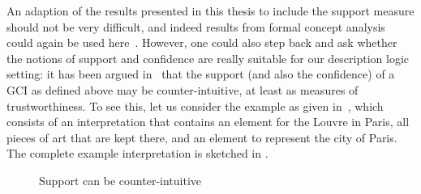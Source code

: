 An adaption of the results presented in this thesis to include the support measure should
not be very difficult, and indeed results from formal concept analysis could again be used
here~\cite{DBLP:conf/ki/StummeTBPL01,arules:Stumme:2002}.  However, one could also step
back and ask whether the notions of support and confidence are really suitable for our
description logic setting: it has been argued in~\cite{DBLP:conf/icdm/BorchmannD11} that
the support (and also the confidence) of a GCI as defined above may be counter-intuitive,
at least as measures of trustworthiness.  To see this, let us consider the example as
given in~\cite{DBLP:conf/icdm/BorchmannD11}, which consists of an interpretation that
contains an element for the Louvre in Paris, all pieces of art that are kept there, and an
element to represent the city of Paris.  The complete example interpretation is sketched
in .

\begin{figure}[t]
  \centering
  \caption{Support can be counter-intuitive}
  \label{fig:support-of-gcis-can-be-counter-intuitive}
\end{figure}

